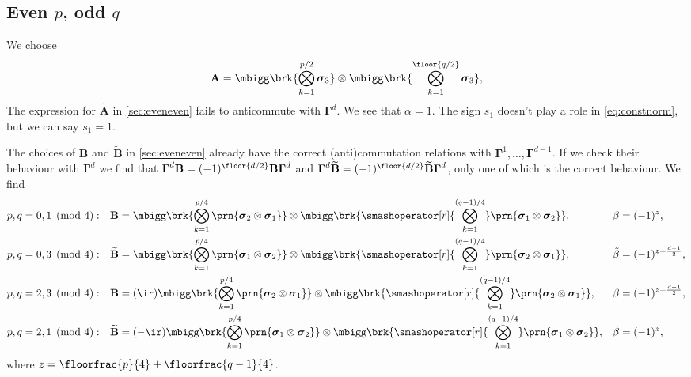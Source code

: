 \documentclass[11pt]{article}
\newcommand{\Gammab}{\boldsymbol{\Gamma}}
\newcommand{\A}{\mathbf{A}}
\newcommand{\B}{\mathbf{B}}
\newcommand{\At}{\widetilde{\A}}
\newcommand{\Bt}{\widetilde{\B}}
\newcommand{\sigmab}{\boldsymbol{\sigma}}
\newcommand{\betat}{\tilde{\beta}}
\begin{document}

\subsection{Even \texorpdfstring{$p$}{p}, odd \texorpdfstring{$q$}{q}}\label{sec:evenodd}

We choose
%
\begin{equation*}
  \A =  \mbigg\brk{\bigotimes_{k=1}^{{p/2}} \sigmab_3}
        \otimes \mbigg\brk{\bigotimes_{k=1}^{\floor{q/2}} \sigmab_3},
\end{equation*}
%
The expression for $\At$ in \cref{sec:eveneven} fails to anticommute with $\Gammab^d$.
We see that $\alpha = 1$.
The sign $s_1$ doesn't play a role in \cref{eq:constnorm}, but we can say $s_1 = 1$.

The choices of $\B$ and $\Bt$ in \cref{sec:eveneven} already have the correct (anti)commutation relations with $\Gammab^1, \ldots, \Gammab^{d-1}$.
If we check their behaviour with $\Gammab^d$ we find that $\Gammab^d \B = (-1)^{\floor{d/2}}\B \Gammab^d$ and $\Gammab^d \Bt = (-1)^{\floor{d/2}}\Bt \Gammab^d$, only one of which is the correct behaviour.
We find
%
\begin{equation*}
\begin{aligned}
  p,q &= 0,1 \pmod 4: &
  \B &= \mbigg\brk{\bigotimes_{k=1}^{p/4}
        \prn{\sigmab_2 \otimes \sigmab_1}} \otimes
        \mbigg\brk{\smashoperator[r]{\bigotimes_{k=1}^{(q-1)/4}}
        \prn{\sigmab_1 \otimes \sigmab_2}}, &
  \beta &= (-1)^{z}, \\
  p,q &= 0,3 \pmod 4: &
  \Bt &= \mbigg\brk{\bigotimes_{k=1}^{p/4}
        \prn{\sigmab_1 \otimes \sigmab_2}} \otimes
        \mbigg\brk{\smashoperator[r]{\bigotimes_{k=1}^{(q-1)/4}}
        \prn{\sigmab_2 \otimes \sigmab_1}}, &
  \betat &= (-1)^{z + \frac{d-1}{2}}, \\
  p,q &= 2,3 \pmod 4: &
  \B &= (\ir)
        \mbigg\brk{\bigotimes_{k=1}^{p/4}
        \prn{\sigmab_2 \otimes \sigmab_1}} \otimes
        \mbigg\brk{\smashoperator[r]{\bigotimes_{k=1}^{(q-1)/4}}
        \prn{\sigmab_2 \otimes \sigmab_1}}, &
  \beta &= (-1)^{z + \frac{d-1}{2}}, \\
  p,q &= 2,1 \pmod 4: &
  \Bt &= (-\ir)
        \mbigg\brk{\bigotimes_{k=1}^{p/4}
        \prn{\sigmab_1 \otimes \sigmab_2}} \otimes
        \mbigg\brk{\smashoperator[r]{\bigotimes_{k=1}^{(q-1)/4}}
        \prn{\sigmab_1 \otimes \sigmab_2}}, &
  \betat &= (-1)^{z}, 
\end{aligned}
\end{equation*}
%
where \( z = \floorfrac{p}{4} + \floorfrac{q-1}{4}\).
\end{document}
